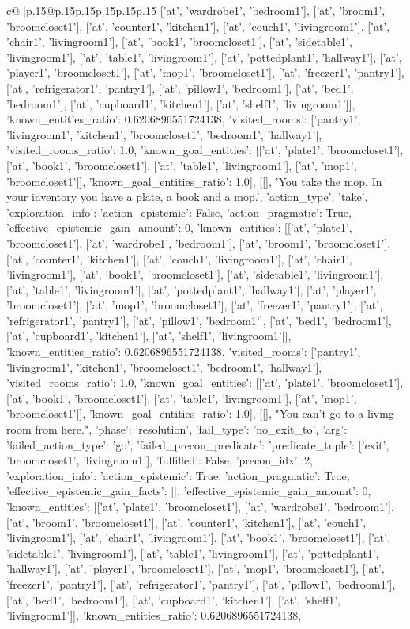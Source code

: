 \documentclass{article}
\begin{document}
{\begin{supertabular}{c@{$\;$}|p{.15\linewidth}@{}p{.15\linewidth}p{.15\linewidth}p{.15\linewidth}p{.15\linewidth}p{.15\linewidth}}
{{{['at', 'wardrobe1', 'bedroom1'], ['at', 'broom1', 'broomcloset1'], ['at', 'counter1', 'kitchen1'], ['at', 'couch1', 'livingroom1'], ['at', 'chair1', 'livingroom1'], ['at', 'book1', 'broomcloset1'], ['at', 'sidetable1', 'livingroom1'], ['at', 'table1', 'livingroom1'], ['at', 'pottedplant1', 'hallway1'], ['at', 'player1', 'broomcloset1'], ['at', 'mop1', 'broomcloset1'], ['at', 'freezer1', 'pantry1'], ['at', 'refrigerator1', 'pantry1'], ['at', 'pillow1', 'bedroom1'], ['at', 'bed1', 'bedroom1'], ['at', 'cupboard1', 'kitchen1'], ['at', 'shelf1', 'livingroom1']], 'known_entities_ratio': 0.6206896551724138, 'visited_rooms': ['pantry1', 'livingroom1', 'kitchen1', 'broomcloset1', 'bedroom1', 'hallway1'], 'visited_rooms_ratio': 1.0, 'known_goal_entities': [['at', 'plate1', 'broomcloset1'], ['at', 'book1', 'broomcloset1'], ['at', 'table1', 'livingroom1'], ['at', 'mop1', 'broomcloset1']], 'known_goal_entities_ratio': 1.0}}], [[], 'You take the mop. In your inventory you have a plate, a book and a mop.', {'action_type': 'take', 'exploration_info': {'action_epistemic': False, 'action_pragmatic': True, 'effective_epistemic_gain_amount': 0, 'known_entities': [['at', 'plate1', 'broomcloset1'], ['at', 'wardrobe1', 'bedroom1'], ['at', 'broom1', 'broomcloset1'], ['at', 'counter1', 'kitchen1'], ['at', 'couch1', 'livingroom1'], ['at', 'chair1', 'livingroom1'], ['at', 'book1', 'broomcloset1'], ['at', 'sidetable1', 'livingroom1'], ['at', 'table1', 'livingroom1'], ['at', 'pottedplant1', 'hallway1'], ['at', 'player1', 'broomcloset1'], ['at', 'mop1', 'broomcloset1'], ['at', 'freezer1', 'pantry1'], ['at', 'refrigerator1', 'pantry1'], ['at', 'pillow1', 'bedroom1'], ['at', 'bed1', 'bedroom1'], ['at', 'cupboard1', 'kitchen1'], ['at', 'shelf1', 'livingroom1']], 'known_entities_ratio': 0.6206896551724138, 'visited_rooms': ['pantry1', 'livingroom1', 'kitchen1', 'broomcloset1', 'bedroom1', 'hallway1'], 'visited_rooms_ratio': 1.0, 'known_goal_entities': [['at', 'plate1', 'broomcloset1'], ['at', 'book1', 'broomcloset1'], ['at', 'table1', 'livingroom1'], ['at', 'mop1', 'broomcloset1']], 'known_goal_entities_ratio': 1.0}}], [[], "You can't go to a living room from here.", {'phase': 'resolution', 'fail_type': 'no_exit_to', 'arg': {'failed_action_type': 'go', 'failed_precon_predicate': {'predicate_tuple': ['exit', 'broomcloset1', 'livingroom1'], 'fulfilled': False, 'precon_idx': 2}}, 'exploration_info': {'action_epistemic': True, 'action_pragmatic': True, 'effective_epistemic_gain_facts': [], 'effective_epistemic_gain_amount': 0, 'known_entities': [['at', 'plate1', 'broomcloset1'], ['at', 'wardrobe1', 'bedroom1'], ['at', 'broom1', 'broomcloset1'], ['at', 'counter1', 'kitchen1'], ['at', 'couch1', 'livingroom1'], ['at', 'chair1', 'livingroom1'], ['at', 'book1', 'broomcloset1'], ['at', 'sidetable1', 'livingroom1'], ['at', 'table1', 'livingroom1'], ['at', 'pottedplant1', 'hallway1'], ['at', 'player1', 'broomcloset1'], ['at', 'mop1', 'broomcloset1'], ['at', 'freezer1', 'pantry1'], ['at', 'refrigerator1', 'pantry1'], ['at', 'pillow1', 'bedroom1'], ['at', 'bed1', 'bedroom1'], ['at', 'cupboard1', 'kitchen1'], ['at', 'shelf1', 'livingroom1']], 'known_entities_ratio': 0.6206896551724138, }}}
\end{supertabular}}
\end{document}
